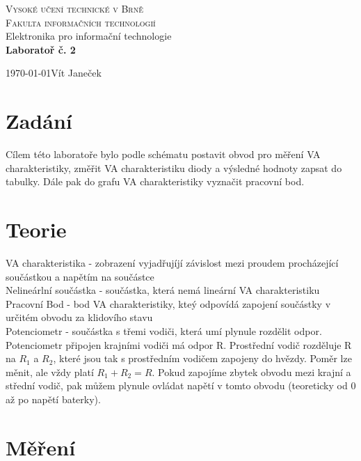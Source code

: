 \documentclass[11pt,a4paper,titlepage]{article}
\begin{document}
\begin{titlepage}
\begin{center}
                      
{\Huge\textsc{ Vysoké učení technické v Brně }}\\
\bigskip
{\LARGE\textsc{ Fakulta informačních technologií }}\\
\bigskip
{}
{\LARGE{Elektronika pro informační technologie}\\
\medskip
\textbf{\Huge Laboratoř č. 2}}

\end{center}
{\Large\today \hfill Vít Janeček }
\end{titlepage}
    

\section{Zadání}
Cílem této laboratoře bylo podle schématu postavit obvod pro měření VA charakteristiky,
změřit VA charakteristiku diody a výsledné hodnoty zapsat do tabulky.
Dále pak do grafu VA charakteristiky vyznačit pracovní bod.
\section{Teorie}

VA charakteristika - zobrazení vyjadřujíjí závislost mezi proudem procházející součástkou a napětím na součástce \\
Nelineárlní součástka - součástka, která nemá lineární VA charakteristiku \\
Pracovní Bod - bod VA charakteristiky, kteý odpovídá zapojení součástky v určitém obvodu za klidovího stavu\\
Potenciometr - součástka s třemi vodiči, která umí plynule rozdělit odpor.
Potenciometr připojen krajními vodiči má odpor R. Prostřední vodič rozděluje R na $R_{1}$ a $R_{2}$, které jsou tak s prostředním vodičem zapojeny do hvězdy.
Poměr lze měnit, ale vždy platí $R_{1} + R_{2} = R$.
Pokud zapojíme zbytek obvodu mezi krajní a střední vodič, pak můžem plynule ovládat napětí v tomto obvodu (teoreticky od 0 až po napětí baterky).

           
\section{Měření}
\end{document}
